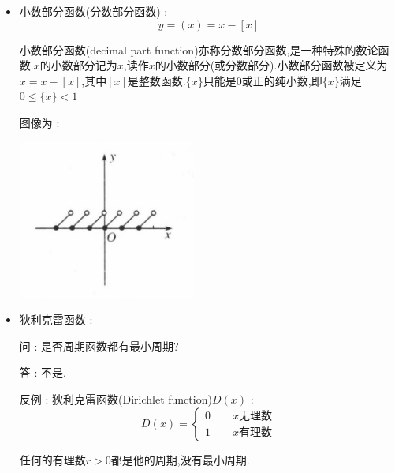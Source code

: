 {{{\begin{itemize}
{              下取整函数的符号用方括号$[x]$表示,称作高斯符号.
              }
        \item {
              小数部分函数(分数部分函数) : $$
                  y = (x) = x - [x]
              $$

              小数部分函数(decimal part function)亦称分数部分函数,是一种特殊的数论函数.$x$的小数部分记为${x}$,读作$x$的小数部分(或分数部分).小数部分函数被定义为${x}=x-[x]$,其中$[x]$是整数函数.$\{x\}$只能是0或正的纯小数,即$\{x\}$满足$0≤\{x\}<1$


              图像为 :

              \begin{center}
                  \includegraphics[]{resources/DecimalPartFunction.png}
              \end{center}
              }
        \item {
              狄利克雷函数 :

              问 : 是否周期函数都有最小周期?

              答 : 不是.

              反例 : 狄利克雷函数(Dirichlet function)$D(x)$ : $$
                  D(x)
                  =
                  \begin{cases}
                      0\qquad \mbox{$x$无理数} \\
                      1\qquad \mbox{$x$有理数}
                  \end{cases}
              $$


              任何的有理数$r > 0$都是他的周期,没有最小周期.
              }
    \end{itemize}
}%

}%

}%